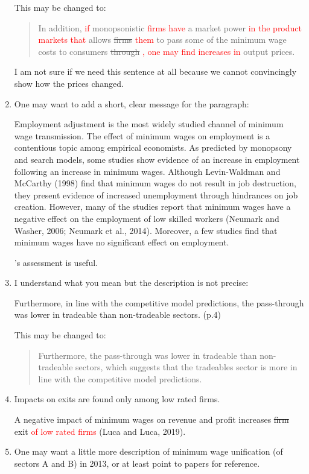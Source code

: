 \begin{enumerate}
This may be changed to:\\
\begin{quotation}
In addition, \textcolor{red}{if} monopsonistic \textcolor{red}{firms have} a market power \textcolor{red}{in the product markets that} allows \sout{firms} \textcolor{red}{them} to pass some of the minimum wage costs to consumers \sout{through} \textcolor{red}{, one may find increases in} output prices.
\end{quotation}
I am not sure if we need this sentence at all because we cannot convincingly show how the prices changed.
\item	One may want to add a short, clear message for the paragraph: 
\begin{lightgrayleftbar}
Employment adjustment is the most widely studied channel of minimum wage transmission. The effect of minimum wages on employment is a contentious topic among empirical economists. As predicted by monopsony and search models, some studies show evidence of an increase in employment following an increase in minimum wages. Although Levin-Waldman and McCarthy (1998) find that minimum wages do not result in job destruction, they present evidence of increased unemployment through hindrances on job creation. However, many of the studies report that minimum wages have a negative effect on the employment of low skilled workers (Neumark and Washer, 2006; Neumark et al., 2014). Moreover, a few studies find that minimum wages have no significant effect on employment. 
\end{lightgrayleftbar}
\citet{Manning2021}'s assessment is useful.
\item	I understand what you mean but the description is not precise:
\begin{lightgrayleftbar}
Furthermore, in line with the competitive model predictions, the pass-through was lower in tradeable than non-tradeable sectors. (p.4)
\end{lightgrayleftbar}
This may be changed to:\\
\begin{quotation}
Furthermore, the pass-through was lower in tradeable than non-tradeable sectors, which suggests that the tradeables sector is more in line with the competitive model predictions.
\end{quotation}
\item	Impacts on exits are found only among low rated firms.
\begin{lightgrayleftbar}
A negative impact of minimum wages on revenue and profit increases \sout{firm} exit \textcolor{red}{of low rated firms} (Luca and Luca, 2019).
\end{lightgrayleftbar}
\item	One may want a little more description of minimum wage unification (of sectors A and B) in 2013, or at least point to papers for reference.
\end{enumerate}


{\footnotesize
\setlength{\baselineskip}{8pt}

}



